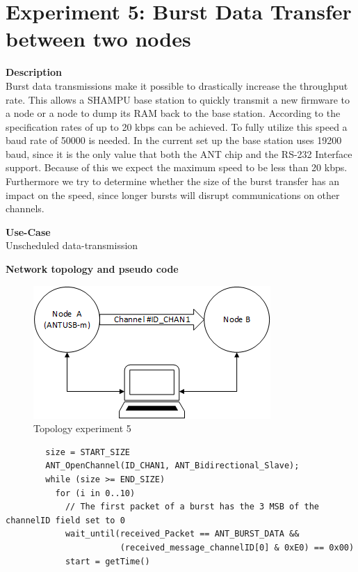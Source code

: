 \section{Experiment 5: Burst Data Transfer between two nodes}
\begin{description} 
	\item{\textbf{Description}} \hfill \\ Burst data transmissions make it possible to drastically increase the throughput rate. This allows a SHAMPU base station to quickly transmit a new firmware to a node or a node to dump its RAM back to the base station.	According to the  specification rates of up to 20 kbps can be achieved. To fully utilize this speed a baud rate of 50000 is needed. In the current set up the base station uses 19200 baud, since it is the only value that both the ANT chip and the RS-232 Interface support. Because of this we expect the maximum speed to be less than 20 kbps. Furthermore we try to determine whether the size of the burst transfer has an impact on the speed, since longer bursts will disrupt communications on other channels.
	\item{\textbf{Use-Case}} \hfill \\ Unscheduled data-transmission
	\item{\textbf{Network topology and pseudo code}} \hfill \\ 
	\begin{figure}[H]
		\centering
		\includegraphics[scale=1]{content/images/exp5_topo.png}
		\caption{Topology experiment 5}
	\end{figure}
	\begin{code}[H]
		\begin{verbatim}
		size = START_SIZE
		ANT_OpenChannel(ID_CHAN1, ANT_Bidirectional_Slave);		
		while (size >= END_SIZE)
		  for (i in 0..10) 
		    // The first packet of a burst has the 3 MSB of the channelID field set to 0
		    wait_until(received_Packet == ANT_BURST_DATA && 
		               (received_message_channelID[0] & 0xE0) == 0x00)
		    start = getTime()

\end{verbatim}
\end{code}
\end{description}
